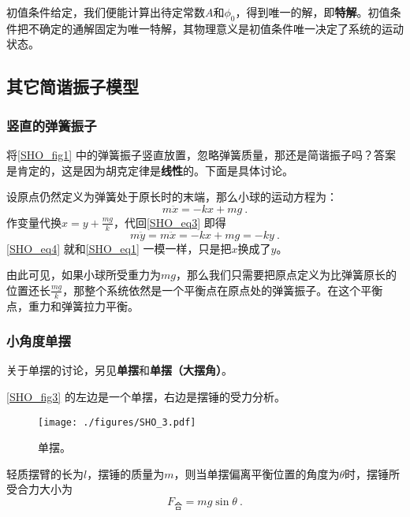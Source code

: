 初值条件给定，我们便能计算出待定常数$A$和$\phi_0$，得到唯一的解，即\textbf{特解}。初值条件把不确定的通解固定为唯一特解，其物理意义是初值条件唯一决定了系统的运动状态。


\subsection{其它简谐振子模型}

\subsubsection{竖直的弹簧振子}

将\autoref{SHO_fig1} 中的弹簧振子竖直放置，忽略弹簧质量，那还是简谐振子吗？答案是肯定的，这是因为胡克定律是\textbf{线性}的。下面是具体讨论。

设原点仍然定义为弹簧处于原长时的末端，那么小球的运动方程为：
\begin{equation}\label{SHO_eq3}
m\ddot{x} = -kx+mg~.
\end{equation}
作变量代换$x=y+\frac{mg}{k}$，代回\autoref{SHO_eq3} 即得
\begin{equation}\label{SHO_eq4}
m\ddot{y} = m\ddot{x} = -kx+mg = -ky~.
\end{equation}
\autoref{SHO_eq4} 就和\autoref{SHO_eq1} 一模一样，只是把$x$换成了$y$。

由此可见，如果小球所受重力为$mg$，那么我们只需要把原点定义为比弹簧原长的位置还长$\frac{mg}{k}$，那整个系统依然是一个平衡点在原点处的弹簧振子。在这个平衡点，重力和弹簧拉力平衡。


\subsubsection{小角度单摆}

关于单摆的讨论，另见\textbf{单摆}和\textbf{单摆（大摆角）}。

\autoref{SHO_fig3} 的左边是一个单摆，右边是摆锤的受力分析。

\begin{figure}[ht]
\centering
\texttt{[image: ./figures/SHO\_3.pdf]}
\caption{单摆。} \label{SHO_fig3}
\end{figure}

轻质摆臂的长为$l$，摆锤的质量为$m$，则当单摆偏离平衡位置的角度为$\theta$时，摆锤所受合力大小为
\begin{equation}
F_{\text{合}} = mg\sin\theta~.
\end{equation}

